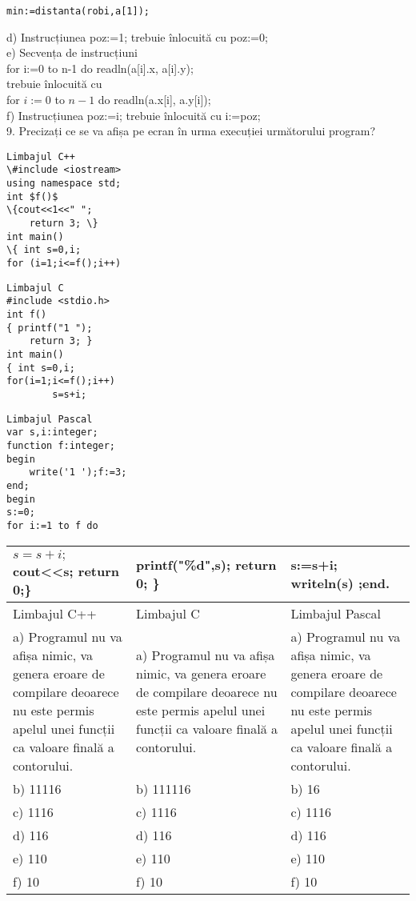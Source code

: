 \begin{verbatim}
min:=distanta(robi,a[1]);
\end{verbatim}

d) Instrucțiunea poz:=1; trebuie înlocuită cu poz:=0;\\
e) Secvența de instrucțiuni\\[0pt]
for i:=0 to n-1 do readln(a[i].x, a[i].y);\\
trebuie înlocuită cu\\
for $i:=0$ to $n-1$ do readln(a.x[i], a.y[i]);\\
f) Instrucțiunea poz:=i; trebuie înlocuită cu i:=poz;\\
9. Precizați ce se va afișa pe ecran în urma execuției următorului program?

\begin{verbatim}
Limbajul C++
\#include <iostream>
using namespace std;
int $f()$
\{cout<<1<<" ";
    return 3; \}
int main()
\{ int s=0,i;
for (i=1;i<=f();i++)
\end{verbatim}

\begin{verbatim}
Limbajul C
#include <stdio.h>
int f()
{ printf("1 ");
    return 3; }
int main()
{ int s=0,i;
for(i=1;i<=f();i++)
        s=s+i;
\end{verbatim}

\begin{verbatim}
Limbajul Pascal
var s,i:integer;
function f:integer;
begin
    write('1 ');f:=3;
end;
begin
s:=0;
for i:=1 to f do
\end{verbatim}

\begin{center}
\begin{tabular}{|l|l|l|}
\hline
$s=s+i ;$ cout<<s; return 0;\} & printf("\%d",s); return 0; \} & s:=s+i; writeln(s) ;end. \\
\hline
Limbajul C++ & Limbajul C & Limbajul Pascal \\
\hline
a) Programul nu va afișa nimic, va genera eroare de compilare deoarece nu este permis apelul unei funcții ca valoare finală a contorului. & a) Programul nu va afișa nimic, va genera eroare de compilare deoarece nu este permis apelul unei funcții ca valoare finală a contorului. & a) Programul nu va afișa nimic, va genera eroare de compilare deoarece nu este permis apelul unei funcții ca valoare finală a contorului. \\
\hline
b) 11116 & b) 111116 & b) 16 \\
\hline
c) 1116 & c) 1116 & c) 1116 \\
\hline
d) 116 & d) 116 & d) 116 \\
\hline
e) 110 & e) 110 & e) 110 \\
\hline
f) 10 & f) 10 & f) 10 \\
\hline
\end{tabular}
\end{center}

